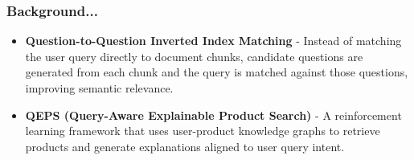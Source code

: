 \begin{frame}
\frametitle{Background...}

\begin{itemize}
    \item \textbf{Question-to-Question Inverted Index Matching} - Instead of matching the user query directly to document chunks, candidate questions are generated from each chunk and the query is matched against those questions, improving semantic relevance.

    
    \item \textbf{QEPS (Query-Aware Explainable Product Search)} - A reinforcement learning framework that uses user-product knowledge graphs to retrieve products and generate explanations aligned to user query intent.
\end{itemize}

\end{frame}
